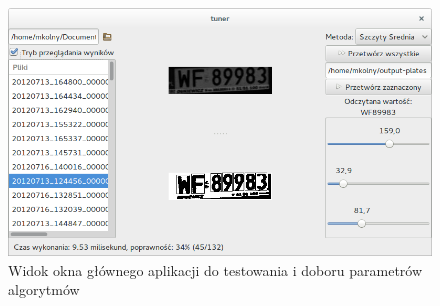 \begin{figure}
  \centering
  \includegraphics[width=1\textwidth]{img/tuner-screenshot}
  \caption{Widok okna głównego aplikacji do testowania i doboru parametrów algorytmów}
  \label{fig:tuner_screenshot}
\end{figure}
